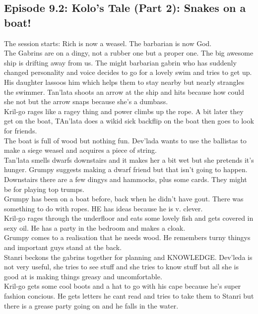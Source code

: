 \subsection{Episode 9.2: Kolo's Tale (Part 2): Snakes on a boat!}
The session starts: Rich is now a weasel. The barbarian is now God.\\
The Gabrins are on a dingy, not a rubber one but a proper one. The big awesome ship is drifting away from us. The might barbarian gabrin who has suddenly changed personality and voice decides to go for a lovely swim and tries to get up.\\
His daughter lassoos him which helps them to stay nearby but nearly strangles the swimmer. Tan’lata shoots an arrow at the ship and hits because how could she not but the arrow snaps because she’s a dumbass.\\
Kril-go rages like a ragey thing and power climbs up the rope. A bit later they get on the boat, TAn’lata does a wikid sick backflip on the boat then goes to look for friends.\\
The boat is full of wood but nothing fun. Dev’lada wants to use the ballistas to make a siege weasel and acquires a piece of string.\\
Tan’lata smells dwarfs downstairs and it makes her a bit wet but she pretends it’s hunger. Grumpy suggests making a dwarf friend but that isn’t going to happen.\\
Downstairs there are a few dingys and hammocks, plus some cards. They might be for playing top trumps.\\
Grumpy has been on a boat before, back when he didn’t have gout. There was something to do with ropes. HE has ideas because he is v. clever.\\
Kril-go rages through the underfloor and eats some lovely fish and gets covered in sexy oil. He has a party in the bedroom and makes a cloak.\\
Grumpy comes to a realisation that he needs wood. He remembers turny thingys and important guys stand at the back.\\
Stanri beckons the gabrins together for planning and KNOWLEDGE. Dev’leda is not very useful, she tries to see stuff and she tries to know stuff but all she is good at is making things greasy and uncomfortable.\\
Kril-go gets some cool boots and a hat to go with his cape because he’s super fashion concious. He gets letters he cant read and tries to take them to Stanri but there is a grease party going on and he falls in the water.\\
